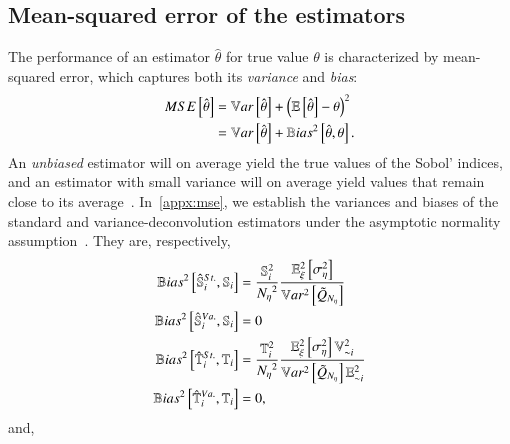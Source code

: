 \subsection{Mean-squared error of the estimators} 
The performance of an estimator $\hat{\theta}$ for true value $\theta$ is characterized by mean-squared error, which captures both its \emph{variance} and \emph{bias}:
\begin{align*}
    MSE \left[ \hat{\theta} \right] &= \mathbb{V}ar\left[\hat{\theta}\right] + \left(\mathbb{E}\left[\hat{\theta}\right] - \theta \right) ^2 \\
    &= \mathbb{V}ar\left[\hat{\theta}\right] + \mathbb{B}ias^2 \left[ \hat{\theta}, \theta \right] .
\end{align*}
An \emph{unbiased} estimator will on average yield the true values of the Sobol' indices, and an estimator with small variance will on average yield values that remain close to its average~\cite{azzini-etal-2021}.
In~\ref{appx:mse}, we establish the variances and biases of the standard and variance-deconvolution estimators under the asymptotic normality assumption~\cite{vandervaart-2000, janon-etal-2014, azzini-etal-2021}.
They are, respectively,
\begin{align} \label{m4eq:bias-s-stan}
    \mathbb{B}ias^2 \left[ \hat{\mathbb{S}}_{i}^{St.}, \mathbb{S}_{i} \right] &= \frac{\mathbb{S}_{i}^2}{{N_\eta}^2} \frac{\mathbb{E}_\xi ^2 \left[\sigma^2_\eta\right]}{\mathbb{V}ar^2\left[\tilde{Q}_{{N_\eta}}\right]} \\
    \mathbb{B}ias^2 \left[ \hat{\mathbb{S}}_{i}^{Va.}, \mathbb{S}_{i} \right] &= 0 \\ \label{m4eq:bias-t-stan}
    \mathbb{B}ias^2 \left[ \hat{\mathbb{T}}_{i}^{St.}, \mathbb{T}_{i} \right] &= \frac{\mathbb{T}_{i}^2}{{N_\eta}^2} \frac{\mathbb{E}_\xi ^2 \left[\sigma^2_\eta\right] \mathbb{V}_{{\sim i}}^2}{\mathbb{V}ar^2\left[\tilde{Q}_{{N_\eta}}\right] \mathbb{E}_{{\sim i}}^2} \\
    \mathbb{B}ias^2 \left[ \hat{\mathbb{T}}_{i}^{Va.}, \mathbb{T}_{i} \right] &= 0 ,
\end{align}
and,
